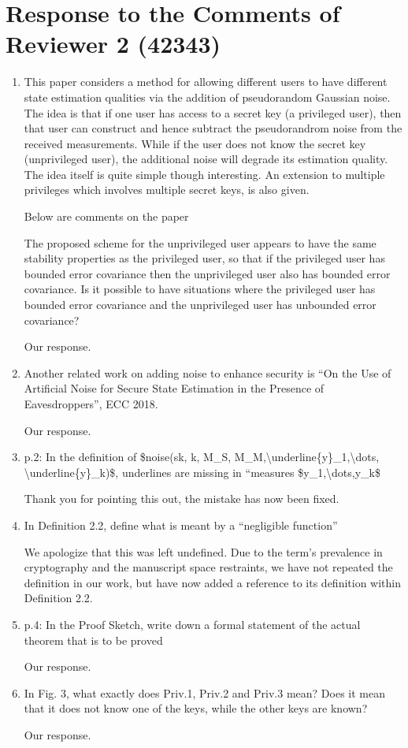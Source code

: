 \documentclass[a4paper]{scrartcl}
\newenvironment{rebuttal}{\begin{enumerate}[label={\color{grey}\thesection.\arabic{enumi}},leftmargin=0pt,ref=\thesection.\arabic{enumi}]}{\end{enumerate}}
\newcommand{\reviewtext}[1]{{\color{nblue} #1}}
\begin{document}
\section*{Response to the Comments of Reviewer 2 (42343)}
\def\thesection{R2}
\begin{rebuttal}
\item \reviewtext{This paper considers a method for allowing different users to have different state estimation qualities via the addition of pseudorandom Gaussian noise. The idea is that if one user has access to a secret key (a privileged user), then that user can construct and hence subtract the pseudorandrom noise from the received measurements. While if the user does not know the secret key (unprivileged user), the additional noise will degrade its estimation quality. The idea itself is quite simple though interesting. An extension to multiple privileges which involves multiple secret keys, is also given. 

Below are comments on the paper

The proposed scheme for the unprivileged user appears to have the same stability properties as the privileged user, so that if the privileged user has bounded error covariance then the unprivileged user also has bounded error covariance. Is it possible to have situations where the privileged user has bounded error covariance and the unprivileged user has unbounded error covariance?}

Our response.

\item \reviewtext{Another related work on adding noise to enhance security is ``On the Use of Artificial Noise for Secure State Estimation in the Presence of Eavesdroppers'', ECC 2018.}

Our response.

\item \reviewtext{p.2: In the definition of \$noise(sk, k, M\_S, M\_M,\textbackslash underline\{y\}\_1,\textbackslash dots, \textbackslash underline\{y\}\_k)\$, underlines are missing in ``measures \$y\_1,\textbackslash dots,y\_k\$}

Thank you for pointing this out, the mistake has now been fixed.

\item \reviewtext{In Definition 2.2, define what is meant by a ``negligible function''}

We apologize that this was left undefined. Due to the term's prevalence in cryptography and the manuscript space restraints, we have not repeated the definition in our work, but have now added a reference to its definition within Definition 2.2.

\item \reviewtext{p.4: In the Proof Sketch, write down a formal statement of the actual theorem that is to be proved}

Our response.

\item \reviewtext{In Fig. 3, what exactly does  Priv.1, Priv.2 and Priv.3 mean? Does it
mean that it does not know one of the keys, while the other keys are
known?}

Our response.

\end{rebuttal}
\end{document}
